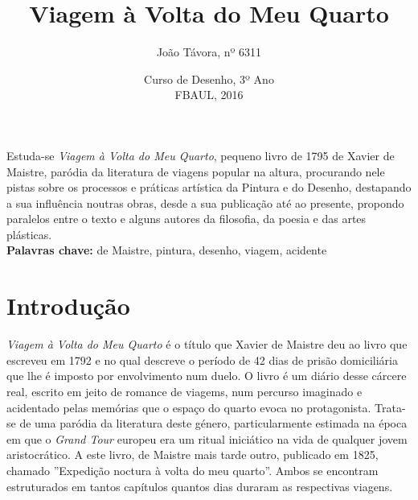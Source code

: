 \documentclass[12pt]{article}
\title{\large{Viagem à Volta do Meu Quarto}}
\author{\vspace*{-3ex}João Távora, nº 6311}
\date{\vspace*{-3ex}Curso de Desenho, 3º Ano\\\vspace*{-1ex}FBAUL, 2016}
\begin{document}

\maketitle

\renewcommand\contentsname{Sumário}
\tableofcontents

\begin{spacing}{1.0}
\begin{small}
  \section{\fontsize{11}{13}\selectfont{Resumo}}

    \noindent Estuda-se \emph{Viagem à Volta do Meu Quarto}, pequeno
    livro de 1795 de Xavier de Maistre, paródia da literatura de
    viagens popular na altura, procurando nele pistas sobre os
    processos e práticas artística da Pintura e do Desenho, destapando
    a sua influência noutras obras, desde a sua publicação até ao
    presente, propondo paralelos entre o texto e alguns autores da
    filosofia, da poesia e das artes plásticas.\\
    \noindent\textbf{Palavras chave:} de Maistre, pintura, desenho,
    viagem, acidente
    
\end{small}

\end{spacing}
\vspace*{-1ex}

\section{Introdução}

\emph{Viagem à Volta do Meu Quarto} é o título que Xavier de Maistre
deu ao livro que escreveu em 1792 e no qual descreve o período de 42
dias de prisão domiciliária que lhe é imposto por envolvimento num
duelo. O livro é um diário desse cárcere real, escrito em jeito de
romance de viagems, num percurso imaginado e acidentado pelas memórias
que o espaço do quarto evoca no protagonista. Trata-se de uma paródia
da literatura deste género, particularmente estimada na época em que o
\emph{Grand Tour} europeu era um ritual iniciático na vida de qualquer
jovem aristocrático. A este livro, de Maistre mais tarde outro,
publicado em 1825, chamado ''Expedição noctura à volta do meu
quarto''. Ambos se encontram estruturados em tantos capítulos quantos
dias duraram as respectivas viagens.
\end{document}
